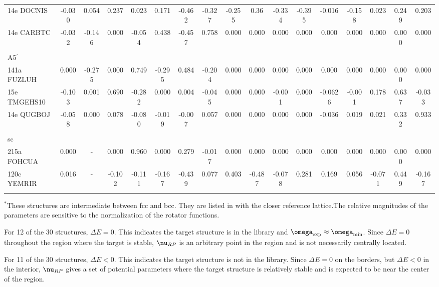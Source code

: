 \documentclass[preprint]{iucr}              %
\newcommand{\mb}[1]{\ensuremath{\mbox{\boldmath $ #1 $}}}
\begin{document}
\begin{landscape}
\begin{table}
\begin{tabular}{lcccccccccccccccc}
14e DOCNIS & -0.030 & 0.054 & 0.237 & 0.023 & 0.171 & -0.462 & -0.327 & -0.255 & 0.36 & -0.334 & -0.395 & -0.016 & -0.158 & 0.023 & 0.249 & 0.203 \\
14e CARBTC & -0.032 & -0.146 & 0.000 & -0.054 & 0.438 & -0.457 & 0.758 & 0.000 & 0.000 & 0.000 & 0.000 & 0.000 & 0.000 & 0.000 & 0.000 & 0.000 \\
\\
A5$^\prime$\\
141a FUZLUH & 0.000 & -0.275 & 0.000 & 0.749 & -0.295 & 0.484 &
-0.204 & 0.000 & 0.000 & 0.000 & 0.000 & 0.000 & 0.000 & 0.000 & 0.000 & 0.000 \\
15e TMGEHS10 & -0.103 & 0.001 & 0.690 & -0.282 & 0.000 & 0.004 &
-0.045 & 0.000 &
0.000 & -0.001 & 0.000 & -0.0626 & -0.001 & 0.178 & 0.637 & -0.033 \\
14e QUGBOJ & -0.058 & 0.000 & 0.078 & -0.080 & -0.019 & -0.007 & 0.057 & 0.000 & 0.000 & 0.000 & 0.000 & -0.036 & 0.019 & 0.021 & 0.332 & 0.933 \\
\\
sc\\
215a FOHCUA & 0.000 & - & 0.000 & 0.960 & 0.000 & 0.279 & -0.017 & 0.000 & 0.000 & 0.000 & 0.000 & 0.000 & 0.000 & 0.000 & 0.000 & 0.000 \\
120c YEMRIR & 0.016 & - & -0.102 & -0.111 & -0.167 & -0.439 & 0.077 & 0.403 & -0.487 & -0.078 & 0.281 & 0.169 & 0.056 & -0.071 & 0.449 & -0.167\\
\hline\\
\end{tabular}
$^*$These structures are intermediate between fcc and bcc. They are
listed in \cite{McClurg05} with the closer reference
lattice.\newline The relative magnitudes of the parameters are
sensitive to the normalization of the rotator functions.
\end{table}
\end{landscape}

For 12 of the 30 structures, $\Delta E=0$.  This indicates the
target structure is in the library and
$\mb{\omega}_{\mathrm{exp}}\approx \mb{\omega}_{\mathrm{min}}$.
Since $\Delta E=0$ throughout the region where the target is stable,
$\mb{\nu}_{RP}$ is an arbitrary point in the region and is not
necessarily centrally located.

For 11 of the 30 structures, $\Delta E<0$. This indicates the target
structure is not in the library.  Since $\Delta E=0$ on the borders,
but $\Delta E<0$ in the interior, $\mb{\nu}_{RP}$ gives a set of
potential parameters where the target structure is relatively stable
and is expected to be near the center of the region.
\end{document}
